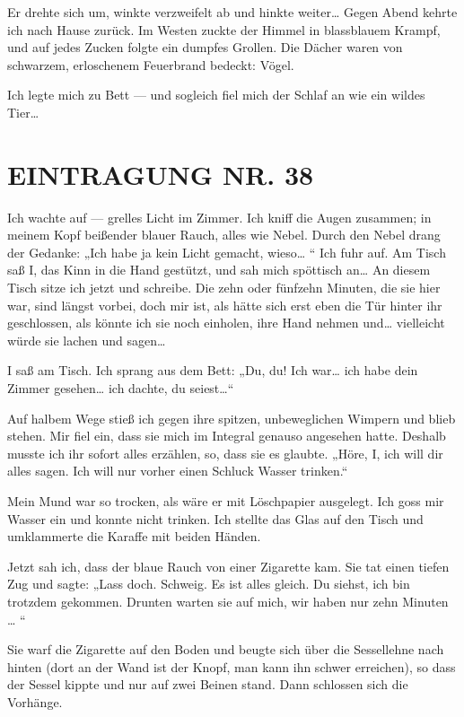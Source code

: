 Er drehte sich um, winkte verzweifelt ab und hinkte weiter\ldots{} Gegen
Abend kehrte ich nach Hause zurück. Im Westen zuckte der Himmel in
blassblauem Krampf, und auf jedes Zucken folgte ein dumpfes
Grollen. Die Dächer waren von schwarzem, erloschenem Feuerbrand
bedeckt: Vögel.

Ich legte mich zu Bett — und sogleich fiel mich der Schlaf an wie
ein wildes Tier\ldots{}

\section{EINTRAGUNG NR. 38}

Ich wachte auf — grelles Licht im Zimmer. Ich kniff die Augen
zusammen; in meinem Kopf beißender blauer Rauch, alles wie Nebel.
Durch den Nebel drang der Gedanke: „Ich habe ja kein Licht gemacht,
wieso\ldots{} “ Ich fuhr auf. Am Tisch saß I, das Kinn in die Hand
gestützt, und sah mich spöttisch an\ldots{} An diesem Tisch sitze ich
jetzt und schreibe. Die zehn oder fünfzehn Minuten, die sie hier
war, sind längst vorbei, doch mir ist, als hätte sich erst eben die
Tür hinter ihr geschlossen, als könnte ich sie noch einholen, ihre
Hand nehmen und\ldots{} vielleicht würde sie lachen und sagen\ldots{}

I saß am Tisch. Ich sprang aus dem Bett: „Du, du! Ich war\ldots{} ich
habe dein Zimmer gesehen\ldots{} ich dachte, du seiest\ldots{}“

Auf halbem Wege stieß ich gegen ihre spitzen, unbeweglichen Wimpern
und blieb stehen. Mir fiel ein, dass sie mich im Integral genauso
angesehen hatte. Deshalb musste ich ihr sofort alles erzählen, so,
dass sie es glaubte. „Höre, I, ich will dir alles sagen. Ich will
nur vorher einen Schluck Wasser trinken.“

Mein Mund war so trocken, als wäre er mit Löschpapier ausgelegt.
Ich goss mir Wasser ein und konnte nicht trinken. Ich stellte das
Glas auf den Tisch und umklammerte die Karaffe mit beiden Händen.

Jetzt sah ich, dass der blaue Rauch von einer Zigarette kam. Sie
tat einen tiefen Zug und sagte: „Lass doch. Schweig. Es ist alles
gleich. Du siehst, ich bin trotzdem gekommen. Drunten warten sie
auf mich, wir haben nur zehn Minuten \ldots{} “

Sie warf die Zigarette auf den Boden und beugte sich über die
Sessellehne nach hinten (dort an der Wand ist der Knopf, man kann
ihn schwer erreichen), so dass der Sessel kippte und nur auf zwei
Beinen stand. Dann schlossen sich die Vorhänge.

